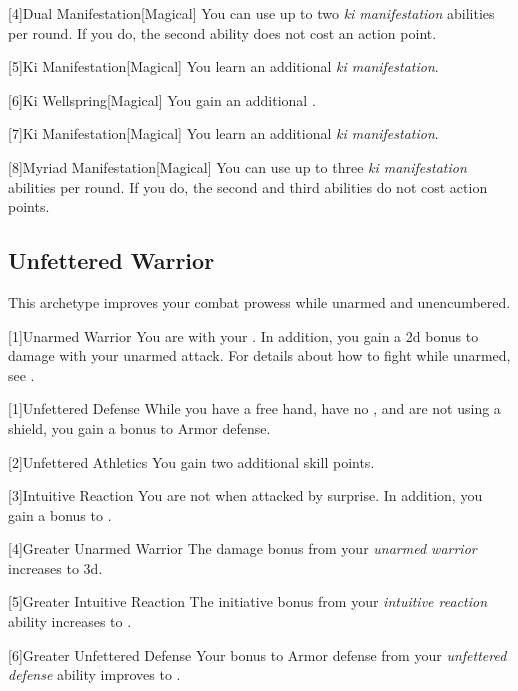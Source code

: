         [4]{Dual Manifestation}[Magical] You can use up to two \textit{ki manifestation} abilities per round.
        If you do, the second ability does not cost an action point.

        [5]{Ki Manifestation}[Magical]
        You learn an additional \textit{ki manifestation}.

        [6]{Ki Wellspring}[Magical] You gain an additional .

        [7]{Ki Manifestation}[Magical]
        You learn an additional \textit{ki manifestation}.

        [8]{Myriad Manifestation}[Magical] You can use up to three \textit{ki manifestation} abilities per round.
        If you do, the second and third abilities do not cost action points.

    \subsection{Unfettered Warrior}\label{Unfettered Warrior}
        This archetype improves your combat prowess while unarmed and unencumbered.

        [1]{Unarmed Warrior}
        You are  with your .
        In addition, you gain a \plus2d bonus to damage with your unarmed attack.
        For details about how to fight while unarmed, see .

        [1]{Unfettered Defense}
        While you have a free hand, have no , and are not using a shield, you gain a  bonus to Armor defense.

        [2]{Unfettered Athletics} You gain two additional skill points.

        [3]{Intuitive Reaction}
        You are not \unaware when attacked by surprise.
        In addition, you gain a  bonus to .

        [4]{Greater Unarmed Warrior} The damage bonus from your \textit{unarmed warrior} increases to \plus3d.

        [5]{Greater Intuitive Reaction}
        The initiative bonus from your \textit{intuitive reaction} ability increases to .

        [6]{Greater Unfettered Defense}
        Your bonus to Armor defense from your \textit{unfettered defense} ability improves to .

